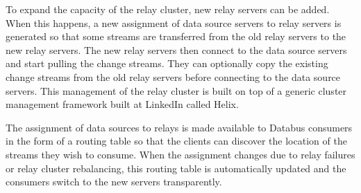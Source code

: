 To expand the capacity of the relay cluster, new relay servers can be added. When this happens, a new assignment of data source servers to relay servers is generated so that some streams are transferred from the old relay servers to the new relay servers. The new relay servers then connect to the data source servers and start pulling the change streams. They can optionally copy the existing change streams from the old relay servers before connecting to the data source servers.
This management of the relay cluster is built on top of a generic cluster management framework built at LinkedIn called Helix.

The assignment of data sources to relays is made available to Databus consumers in the form of a routing table so that the clients can discover the location of the streams they wish to consume. When the assignment changes due to relay failures or relay cluster rebalancing, this routing table is automatically updated and the consumers switch to the new servers transparently.

